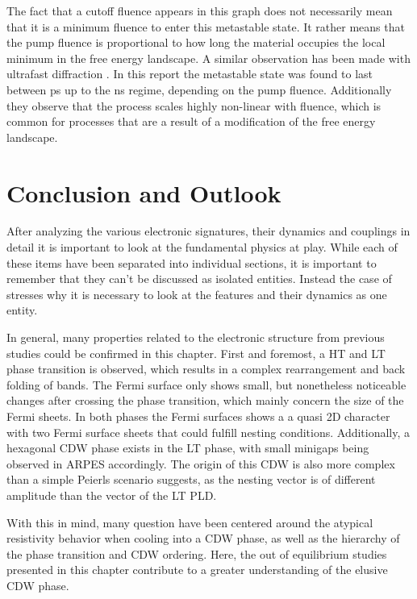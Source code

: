 The fact that a cutoff fluence appears in this graph does not necessarily mean that it is a minimum fluence to enter this metastable state.
It rather means that the pump fluence is proportional to how long the material occupies the local minimum in the free energy landscape.
A similar observation has been made with ultrafast diffraction \cite{domrose_femtosecond_2024}.
In this report the metastable state was found to last between \unit{\pico\second} up to the \unit{\nano\second} regime, depending on the pump fluence.
Additionally they observe that the process scales highly non-linear with fluence, which is common for processes that are a result of a modification of the free energy landscape.

\section{Conclusion and Outlook}

After analyzing the various electronic signatures, their dynamics and couplings in detail it is important to look at the fundamental physics at play.
While each of these items have been separated into individual sections, it is important to remember that they can't be discussed as isolated entities.
Instead the case of  stresses why it is necessary to look at the features and their dynamics as one entity.

In general, many properties related to the electronic structure from previous studies could be confirmed in this chapter.
First and foremost, a HT and LT phase transition is observed, which results in a complex rearrangement and back folding of bands.
The Fermi surface only shows small, but nonetheless noticeable changes after crossing the phase transition, which mainly concern the size of the Fermi sheets.
In both phases the Fermi surfaces shows a a quasi 2D character with two Fermi surface sheets that could fulfill nesting conditions.
Additionally, a hexagonal CDW phase exists in the LT phase, with small minigaps being observed in ARPES accordingly.
The origin of  this CDW is also more complex than a simple Peierls scenario suggests, as the nesting vector is of different amplitude than the vector of the LT PLD.

With this in mind, many question have been centered around the atypical resistivity behavior when cooling into a CDW phase, as well as the hierarchy of the phase transition and CDW ordering.
Here, the out of equilibrium studies presented in this chapter contribute to a greater understanding of the elusive CDW phase. 

